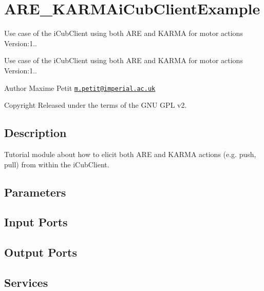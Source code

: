 \hypertarget{group__ARE__KARMAiCubClientExample}{}\section{A\+R\+E\+\_\+\+K\+A\+R\+M\+Ai\+Cub\+Client\+Example}
\label{group__ARE__KARMAiCubClientExample}


Use case of the i\+Cub\+Client using both A\+RE and K\+A\+R\+MA for motor actions Version\+:1..  


Use case of the i\+Cub\+Client using both A\+RE and K\+A\+R\+MA for motor actions Version\+:1.. 

\begin{DoxyAuthor}{Author}
Maxime Petit \href{mailto:m.petit@imperial.ac.uk}{\tt m.\+petit@imperial.\+ac.\+uk} ~\newline
 
\end{DoxyAuthor}
\begin{DoxyCopyright}{Copyright}
Released under the terms of the G\+NU G\+PL v2. 
\end{DoxyCopyright}
\hypertarget{group__touchDetector_intro_sec}{}\subsection{Description}\label{group__touchDetector_intro_sec}
Tutorial module about how to elicit both A\+RE and K\+A\+R\+MA actions (e.\+g. push, pull) from within the i\+Cub\+Client.\hypertarget{group__touchDetector_parameters_sec}{}\subsection{Parameters}\label{group__touchDetector_parameters_sec}
\hypertarget{group__touchDetector_inputports_sec}{}\subsection{Input Ports}\label{group__touchDetector_inputports_sec}
\hypertarget{group__touchDetector_outputports_sec}{}\subsection{Output Ports}\label{group__touchDetector_outputports_sec}
\hypertarget{group__touchDetector_services_sec}{}\subsection{Services}\label{group__touchDetector_services_sec}
